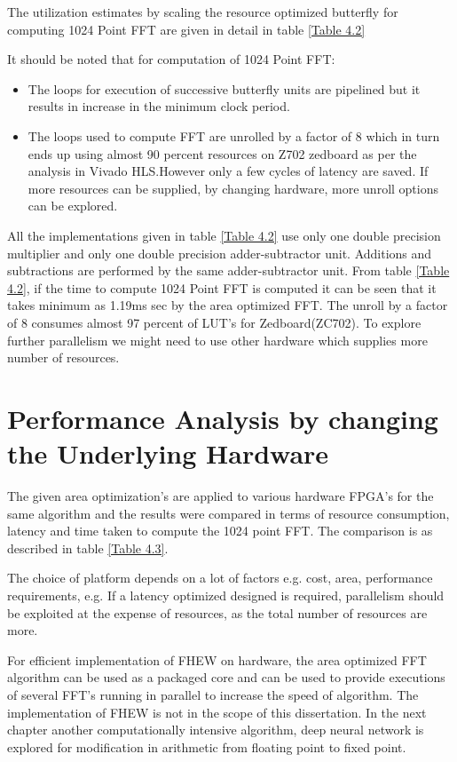 

The utilization estimates by scaling the resource optimized butterfly for computing 1024 Point FFT are given in detail in table \ref{Table 4.2}



It should be noted that for computation of 1024 Point FFT:
\begin{itemize}
\item
The loops for execution of successive butterfly units are pipelined but it results in increase in the minimum clock period. 
\item
The loops used to compute FFT are unrolled by a factor of 8 which in turn ends up using almost 90 percent resources on Z702 zedboard as per the analysis in Vivado HLS.However only a few cycles of latency are saved. If more resources can be supplied, by changing hardware, more unroll options can be explored. 
\end{itemize}


All the implementations given in table \ref{Table 4.2} use only one double precision multiplier and only one double precision adder-subtractor unit. Additions and subtractions are performed by the same adder-subtractor unit. 
From table \ref{Table 4.2}, if the time to compute 1024 Point FFT is computed it can be seen that it takes minimum as 1.19ms sec by the area optimized FFT. The unroll by a factor of 8 consumes almost 97 percent of LUT's for Zedboard(ZC702). To explore further parallelism we might need to use other hardware which supplies more number of resources. 

\section{Performance Analysis by changing the Underlying Hardware}
The given area optimization's are applied to various hardware FPGA's for the same algorithm and the results were compared in terms of resource consumption, latency and time taken to compute the 1024 point FFT. The comparison is as described in table \ref{Table 4.3}.


The choice of platform depends on a lot of factors e.g. cost, area, performance requirements, e.g. If a latency optimized designed is required, parallelism should be exploited at the expense of resources, as the total number of resources are more. 

For efficient implementation of FHEW on hardware, the area optimized FFT algorithm can be used as a packaged core and can be used to provide executions of several FFT's running in parallel to increase the speed of algorithm. The implementation of FHEW is not in the scope of this dissertation. In the next chapter another computationally intensive algorithm, deep neural network is explored for modification in arithmetic from floating point to fixed point.




